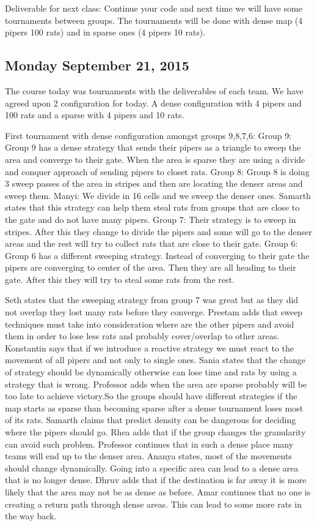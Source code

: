 Deliverable for next class:
Continue your code and next time we will have some tournaments between groups.
The tournaments will be done with dense map (4 pipers 100 rats) and in sparse ones (4 pipers 10 rats).

\subsection{Monday September 21, 2015}
The course today was tournaments with the deliverables of each team. We have agreed upon 2 configuration for today. A dense configuration with 4 pipers and 100 rats and a sparse with 4 pipers and 10 rats. 

First tournament with dense configuration amongst groups 9,8,7,6:
Group 9: Group 9 has a dense strategy that sends their pipers as a triangle to sweep the area and converge to their gate. When the area is sparse they are using a divide and conquer approach of sending pipers to closet rats.
Group 8: Group 8 is doing 3 sweep passes of the area in stripes and then are locating the denser areas and sweep them.
Manyi: We divide in 16 cells and we sweep the denser ones.
Samarth states that this strategy can help them steal rats from groups that are close to the gate and do not have many pipers.
Group 7: Their strategy is to sweep in stripes. After this they change to divide the pipers and some will go to the denser areas and the rest will try to collect rats that are close to their gate.
Group 6: Group 6 has a different sweeping strategy. Instead of converging to their gate the pipers are converging to center of the area. Then they are all heading to their gate. After this they will try to steal some rats from the rest.

Seth states that the sweeping strategy from group 7 was great but as they did not overlap they lost many rats before they converge.
Preetam adds that sweep techniques must take into consideration where are the other pipers and avoid them in order to lose less rats and probably cover/overlap to other areas.
Konstantin says that if we introduce a reactive strategy we must react to the movement of all pipers and not only to single ones.
Sania states that the change of strategy should be dynamically otherwise can lose time and rats by using a strategy that is wrong.
Professor adds when the area are sparse probably will be too late to achieve victory.So the groups should have different strategies if the map starts as sparse than becoming sparse after a dense tournament loses most of its rats.
Samarth claims that predict density can be dangerous for deciding where the pipers should go.
Rhea adds that if the group changes the granularity can avoid such problem.
Professor continues that in such a dense place many teams will end up to the denser area.
Ananya states, most of the movements should change dynamically. Going into a specific area can lead to a dense area that is no longer dense.
Dhruv adds that if the destination is far away it is more likely that the area may not be as dense as before.
Amar continues that no one is creating a return path through dense areas. This can lead to some more rats in the way back.

